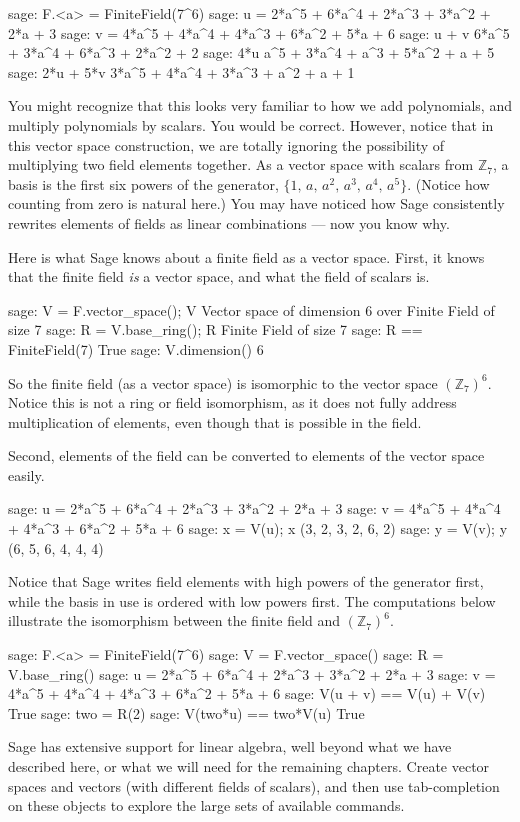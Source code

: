 %
\begin{sageexample}
sage: F.<a> = FiniteField(7^6)
sage: u = 2*a^5 + 6*a^4 + 2*a^3 + 3*a^2 + 2*a + 3
sage: v = 4*a^5 + 4*a^4 + 4*a^3 + 6*a^2 + 5*a + 6
sage: u + v
6*a^5 + 3*a^4 + 6*a^3 + 2*a^2 + 2
sage: 4*u
a^5 + 3*a^4 + a^3 + 5*a^2 + a + 5
sage: 2*u + 5*v
3*a^5 + 4*a^4 + 3*a^3 + a^2 + a + 1
\end{sageexample}
%
You might recognize that this looks very familiar to how we add polynomials, and multiply polynomials by scalars.  You would be correct.  However, notice that in this vector space construction, we are totally ignoring the possibility of multiplying two field elements together.  As a vector space with scalars from ${\mathbb Z}_7$, a basis is the first six powers of the generator, $\{1,\,a,\,a^2,\,a^3,\,a^4,\,a^5\}$.  (Notice how counting from zero is natural here.)  You may have noticed how Sage consistently rewrites elements of fields as linear combinations --- now you know why.\par
%
Here is what Sage knows about a finite field as a vector space.  First, it knows that the finite field \emph{is} a vector space, and what the field of scalars is.
%
\begin{sageexample}
sage: V = F.vector_space(); V
Vector space of dimension 6 over Finite Field of size 7
sage: R = V.base_ring(); R
Finite Field of size 7
sage: R == FiniteField(7)
True
sage: V.dimension()
6
\end{sageexample}
%
So the finite field (as a vector space) is isomorphic to the vector space $({\mathbb Z}_7)^6$.  Notice this is not a ring or field isomorphism, as it does not fully address multiplication of elements, even though that is possible in the field.\par
%
Second, elements of the field can be converted to elements of the vector space easily.
%
\begin{sageexample}
sage: u = 2*a^5 + 6*a^4 + 2*a^3 + 3*a^2 + 2*a + 3
sage: v = 4*a^5 + 4*a^4 + 4*a^3 + 6*a^2 + 5*a + 6
sage: x = V(u); x
(3, 2, 3, 2, 6, 2)
sage: y = V(v); y
(6, 5, 6, 4, 4, 4)
\end{sageexample}
%
Notice that Sage writes field elements with high powers of the generator first, while the basis in use is ordered with low powers first.  The computations below illustrate the isomorphism between the finite field and $({\mathbb Z}_7)^6$.
%
\begin{sageexample}
sage: F.<a> = FiniteField(7^6)
sage: V = F.vector_space()
sage: R = V.base_ring()
sage: u = 2*a^5 + 6*a^4 + 2*a^3 + 3*a^2 + 2*a + 3
sage: v = 4*a^5 + 4*a^4 + 4*a^3 + 6*a^2 + 5*a + 6
sage: V(u + v) == V(u) + V(v)
True
sage: two = R(2)
sage: V(two*u) == two*V(u)
True
\end{sageexample}
%
%
Sage has extensive support for linear algebra, well beyond what we have described here, or what we will need for the remaining chapters.  Create vector spaces and vectors (with different fields of scalars), and then use tab-completion on these objects to explore the large sets of available commands.
%

